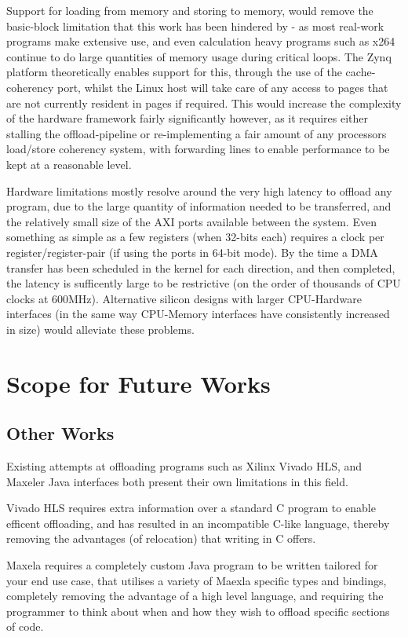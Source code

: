 \documentclass[a4paper]{article}
\begin{document}
Support for loading from memory and storing to memory, would remove the basic-block limitation that this work has been hindered by - as most real-work programs make extensive use, and even calculation heavy programs such as x264 continue to do large quantities of memory usage during critical loops. The Zynq platform theoretically enables support for this, through the use of the cache-coherency port, whilst the Linux host will take care of any access to pages that are not currently resident in pages if required. This would increase the complexity of the hardware framework fairly significantly however, as it requires either stalling the offload-pipeline or re-implementing a fair amount of any processors load/store coherency system, with forwarding lines to enable performance to be kept at a reasonable level.

  Hardware limitations mostly resolve around the very high latency to offload any program, due to the large quantity of information needed to be transferred, and the relatively small size of the AXI ports available between the system. Even something as simple as a few registers (when 32-bits each) requires a clock per register/register-pair (if using the ports in 64-bit mode). By the time a DMA transfer has been scheduled in the kernel for each direction, and then completed, the latency is sufficently large to be restrictive (on the order of thousands of CPU clocks at 600MHz). Alternative silicon designs with larger CPU-Hardware interfaces (in the same way CPU-Memory interfaces have consistently increased in size) would alleviate these problems.

\section{Scope for Future Works}
\subsection{Other Works}
Existing attempts at offloading programs such as Xilinx Vivado HLS\cite{hls}, and Maxeler\cite{mf-fpga} Java interfaces both present their own limitations in this field.

Vivado HLS requires extra information over a standard C program to enable efficent offloading, and has resulted in an incompatible C-like language, thereby removing the advantages (of relocation) that writing in C offers.

Maxela requires a completely custom Java program to be written tailored for your end use case, that utilises a variety of Maexla specific types and bindings, completely removing the advantage of a high level language, and requiring the programmer to think about when and how they wish to offload specific sections of code.
\end{document}
